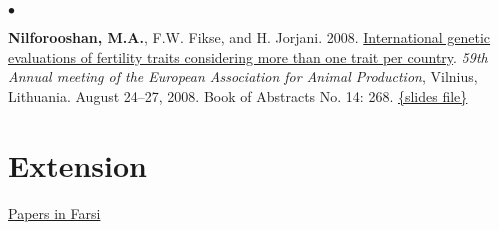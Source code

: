 \documentclass[margin,line]{res}
\newenvironment{list2}{
  \begin{list}{$\bullet$}{%
      \setlength{\itemsep}{0in}
      \setlength{\parsep}{0in} \setlength{\parskip}{0in}
      \setlength{\topsep}{0in} \setlength{\partopsep}{0in}
      \setlength{\leftmargin}{0.2in}}}{\end{list}}
\begin{document}
\begin{resume}
\begin{list2}
    \item {\bf Nilforooshan, M.A.}, F.W. Fikse, and H. Jorjani. 2008. \href{https://www.researchgate.net/publication/358219159_International_genetic_evaluations_of_fertility_traits_considering_more_than_one_trait_per_country}{International genetic evaluations of fertility traits considering more than one trait per country}. {\em 59th Annual meeting of the European Association for Animal Production}, Vilnius, Lithuania. August 24--27, 2008. Book of Abstracts No. 14: 268. \href{https://drive.google.com/file/d/0B2l_izQwJmVpd2pieXNtWTQxMkE/view?usp=sharing&resourcekey=0-Q2h6mMWM8Aw-Tsi787os4g}{\{slides file\}}
  \end{list2}
  \section{\sc Extension}

  \href{https://nilforooshan.github.io/resume/extension}{Papers in Farsi}

\end{resume}
\end{document}
